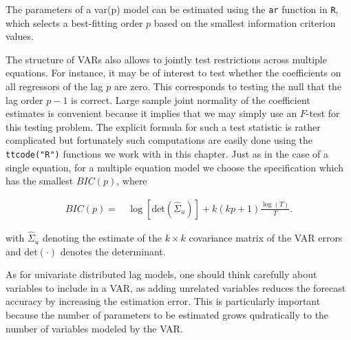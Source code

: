 \documentclass[
  12pt,
]{article}
\begin{document}
The parameters of a var(p) model can be estimated using the \texttt{ar} function in \texttt{R}, which selects a best-fitting order \(p\) based on the smallest information criterion values.

The structure of VARs also allows to jointly test restrictions across multiple equations. For instance, it may be of interest to test whether the coefficients on all regressors of the lag \(p\) are zero. This corresponds to testing the null that the lag order \(p-1\) is correct. Large sample joint normality of the coefficient estimates is convenient because it implies that we may simply use an \(F\)-test for this testing problem. The explicit formula for such a test statistic is rather complicated but fortunately such computations are easily done using the \texttt{ttcode("R")} functions we work with in this chapter. Just as in the case of a single equation, for a multiple equation model we choose the specification which has the smallest \(BIC(p)\), where

\[
\begin{aligned}
  BIC(p) =& \, \log\left[\text{det}(\widehat{\Sigma}_u)\right] + k(kp+1) \frac{\log(T)}{T}.
\end{aligned}
\]

with \(\widehat{\Sigma}_u\) denoting the estimate of the \(k \times k\) covariance matrix of the VAR errors and \(\text{det}(\cdot)\) denotes the determinant.

As for univariate distributed lag models, one should think carefully about variables to include in a VAR, as adding unrelated variables reduces the forecast accuracy by increasing the estimation error. This is particularly important because the number of parameters to be estimated grows qudratically to the number of variables modeled by the VAR.
\end{document}

